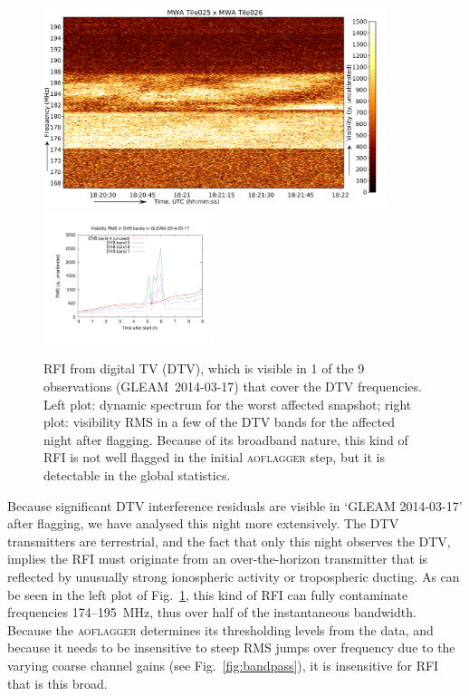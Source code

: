 \documentclass{pasa}
\begin{document}
\noindent\begin{figure}%
\begin{center}\hspace*{-0.2cm}\includegraphics[width=10cm]{img/dvb_example}\includegraphics[width=5cm]{img/2014-03-17-dvb-stddevs}
\end{center}
\caption{RFI from digital TV (DTV), which is visible in 1 of the 9 observations (GLEAM~2014-03-17) that cover the DTV frequencies. Left plot: dynamic spectrum for the worst affected snapshot; right plot: visibility RMS in a few of the DTV bands for the affected night after flagging. Because of its broadband nature, this kind of RFI is not well flagged in the initial \textsc{aoflagger} step, but it is detectable in the global statistics. }
\label{fig:dvb}
\end{figure}

Because significant DTV interference residuals are visible in `GLEAM 2014-03-17' after flagging, we have analysed this night more extensively. The DTV transmitters are terrestrial, and the fact that only this night observes the DTV, implies the RFI must originate from an over-the-horizon transmitter that is reflected by unusually strong ionospheric activity or tropospheric ducting. As can be seen in the left plot of Fig.~\ref{fig:dvb}, this kind of RFI can fully contaminate frequencies 174--195~MHz, thus over half of the instantaneous bandwidth. Because the \textsc{aoflagger} determines its thresholding levels from the data, and because it needs to be insensitive to steep RMS jumps over frequency due to the varying coarse channel gains (see Fig.~\ref{fig:bandpass}), it is insensitive for RFI that is this broad.
\end{document}
